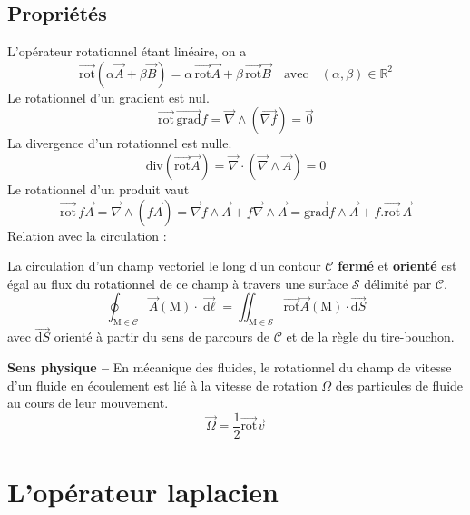 \subsection{Propriétés}
L'opérateur rotationnel étant linéaire, on a 
\[
	\overrightarrow{\text{rot}}\left(\alpha \overrightarrow{A}+\beta \overrightarrow{B}\right) =
	\alpha\,\overrightarrow{\text{rot}}\overrightarrow{A}+\beta\,\overrightarrow{\text{rot}}\overrightarrow{B}		
	\quad\text{avec}\quad	(\alpha,\beta)\in\mathbb{R}^2
\]
Le rotationnel d'un gradient est nul.
\[
\overrightarrow{\text{rot}}\,\overrightarrow{\text{grad}}f = 
\overrightarrow{\nabla}\wedge(\overrightarrow{\nabla f})=\overrightarrow{0}
\]
La divergence d'un rotationnel est nulle.
\[
\text{div}\left(\overrightarrow{\text{rot}}\overrightarrow{A}\right)=
\overrightarrow{\nabla}\cdot\left(\overrightarrow{\nabla}\wedge \overrightarrow{A}\right)=0		
\]
Le rotationnel d'un produit vaut
\[
\overrightarrow{\text{rot}}\,f\overrightarrow{A}=\overrightarrow{\nabla}\wedge(f\overrightarrow{A})=
\overrightarrow{\nabla}f\wedge\overrightarrow{A}+f\overrightarrow{\nabla}\wedge\overrightarrow{A}=
\overrightarrow{\text{grad}}f\wedge\overrightarrow{A}+f.\overrightarrow{\text{rot}}\,\overrightarrow{A}
\]
Relation avec la circulation :
\begin{kaobox}[frametitle=Théorème de Stokes]
La circulation d'un champ vectoriel le long d'un contour $\mathcal{C}$ \textbf{fermé} et \textbf{orienté} est égal au flux du rotationnel de ce champ à travers une surface $\mathcal{S}$ délimité par $\mathcal{C}$.  
\[
	\oint_{\textrm{M}\in \mathcal{C}}\overrightarrow{A}(\textrm{M})\cdot\overrightarrow{\textrm{d}\ell}=
	\iint_{\textrm{M}\in \mathcal{S}}\overrightarrow{\text{rot}}\overrightarrow{A}(\textrm{M})\cdot
	\overrightarrow{\text{d}S}
\]
avec  $\overrightarrow{\text{d}S}$ orienté à partir du sens de parcours de $\mathcal{C}$ et de la règle du tire-bouchon.
\end{kaobox} 

\textbf{Sens physique --} En mécanique des fluides, le rotationnel du champ de vitesse d'un fluide en écoulement est lié à la vitesse de rotation  $\Omega$ des particules de fluide au cours de leur mouvement.
\[
\overrightarrow{\Omega}=\frac{1}{2}\overrightarrow{\textrm{rot}}\overrightarrow{v}
\]	 


\section{L'opérateur laplacien}\label{sec:operateur_laplacien}

